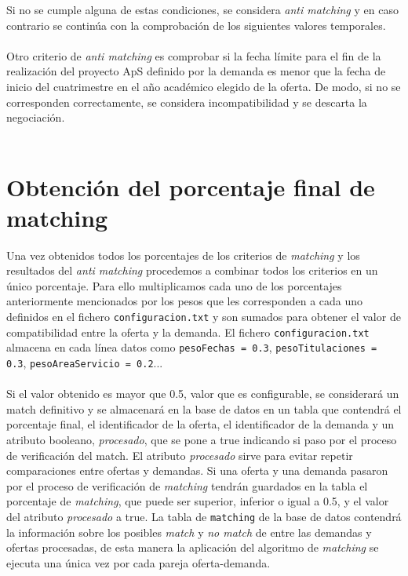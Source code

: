 \documentclass[11pt]{book}
\begin{document}
	Si no se cumple alguna de estas condiciones, se considera \emph{anti matching} y en caso contrario se continúa con la comprobación de los siguientes valores temporales.\\\\
	Otro criterio de \emph{anti matching} es comprobar si la fecha límite para el fin de la realización del proyecto ApS definido por la demanda es menor que la fecha de inicio del cuatrimestre en el año académico elegido de la oferta. De modo, si no se corresponden correctamente, se considera incompatibilidad y se descarta la negociación.\\\\
	\section{Obtención del porcentaje final de matching}
	Una vez obtenidos todos los porcentajes de los criterios de \emph{matching} y los resultados del \emph{anti matching} procedemos a combinar todos los criterios en un único porcentaje. Para ello multiplicamos cada uno de los porcentajes anteriormente mencionados por los pesos que les corresponden a cada uno definidos en el fichero \texttt{configuracion.txt} y son sumados para obtener el valor de compatibilidad entre la oferta y la demanda. El fichero \texttt{configuracion.txt} almacena en cada línea datos como \texttt{pesoFechas = 0.3}, \texttt{pesoTitulaciones = 0.3}, \texttt{pesoAreaServicio = 0.2}...  \\\\
	Si el valor obtenido es mayor que 0.5, valor que es configurable, se considerará un match definitivo y se almacenará en la base de datos en un tabla que contendrá el porcentaje final, el identificador de la oferta, el identificador de la demanda y un atributo booleano, \emph{procesado}, que se pone a true indicando si paso por el proceso de verificación del match. 
	El atributo \emph{procesado} sirve para evitar repetir comparaciones entre ofertas y demandas. Si una oferta y una demanda pasaron por el proceso de verificación de \emph{matching} tendrán guardados en la tabla el porcentaje de \emph{matching}, que puede ser superior, inferior o igual a 0.5, y el valor del atributo \emph{procesado} a true. La tabla de \texttt{matching} de la base de datos contendrá la información sobre los posibles \emph{match} y \emph{no match} de entre las demandas y ofertas procesadas, de esta manera la aplicación del algoritmo de \emph{matching} se ejecuta una única vez por cada pareja oferta-demanda. \\\\
\end{document}
